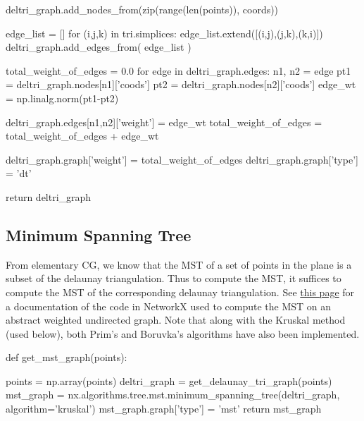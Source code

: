      deltri_graph.add_nodes_from(zip(range(len(points)), coords))

     edge_list = []
     for (i,j,k) in tri.simplices:
         edge_list.extend([(i,j),(j,k),(k,i)])    
     deltri_graph.add_edges_from(  edge_list  )
     
     total_weight_of_edges = 0.0
     for edge in deltri_graph.edges:
           n1, n2 = edge
           pt1 = deltri_graph.nodes[n1]['coods'] 
           pt2 = deltri_graph.nodes[n2]['coods']
           edge_wt = np.linalg.norm(pt1-pt2)

           deltri_graph.edges[n1,n2]['weight'] = edge_wt
           total_weight_of_edges = total_weight_of_edges + edge_wt 
     
     deltri_graph.graph['weight'] = total_weight_of_edges
     deltri_graph.graph['type']   = 'dt'

     return deltri_graph
\nwendcode{}\nwdocspar


\subsection{Minimum Spanning Tree}

From elementary CG, we know that the MST of a set of points in the plane is a subset of the delaunay triangulation. Thus to compute the MST,
it suffices to compute the MST of the corresponding delaunay triangulation. 
See \href{https://networkx.github.io/documentation/stable/reference/algorithms/generated/networkx.algorithms.tree.mst.minimum_spanning_edges.html}{this page}
for a documentation of the code in NetworkX used to compute the MST on an abstract weighted undirected graph. Note that along with the Kruskal method (used below), both Prim's and Boruvka's 
algorithms have also been implemented. 

\nwenddocs{}\plusendmoddef\nwstartdeflinemarkup{}\nwenddeflinemarkup

def get_mst_graph(points):

     points = np.array(points)
     deltri_graph = get_delaunay_tri_graph(points)
     mst_graph = nx.algorithms.tree.mst.minimum_spanning_tree(deltri_graph, algorithm='kruskal')
     mst_graph.graph['type']   = 'mst'
     return mst_graph
\nwendcode{}\nwdocspar





